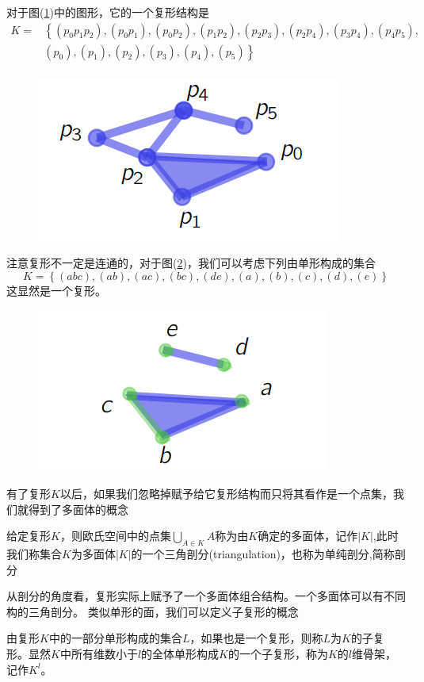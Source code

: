 \begin{example}
对于图(\ref{fig:333})中的图形，它的一个复形结构是
\begin{equation*}
    \begin{split}
      K=&\left\{\right.(p_{0}p_{1}p_{2}),(p_{0}p_{1}),(p_{0}p_{2}),(p_{1}p_{2}),(p_{2}p_{3}),(p_{2}p_{4}),(p_{3}p_{4}),(p_{4}p_{5}),\\
      &(p_{0}),(p_{1}),(p_{2}),(p_{3}),(p_{4}),(p_{5})\left.\right\}\\
    \end{split}
\end{equation*}

\end{example}
\begin{figure}[htbp]
    \centering
    \includegraphics{image/3.png}
    \caption{}
    \label{fig:333}
\end{figure}
注意复形不一定是连通的，对于图(\ref{fig:222})，我们可以考虑下列由单形构成的集合$$K=\left\{(abc),(ab),(ac),(bc),(de),(a),(b),(c),(d),(e)\right\}$$这显然是一个复形。
\begin{figure}[htbp]
    \centering
    \includegraphics{image/2.png}
    \caption{}
    \label{fig:222}
\end{figure}

有了复形$K$以后，如果我们忽略掉赋予给它复形结构而只将其看作是一个点集，我们就得到了多面体的概念
\begin{definition}
给定复形$K$，则欧氏空间中的点集$\bigcup\limits_{A\in K}A$称为由$K$确定的多面体，记作$|K|$,此时我们称集合$K$为多面体$|K|$的一个三角剖分(triangulation)，也称为单纯剖分,简称剖分
\end{definition}
从剖分的角度看，复形实际上赋予了一个多面体组合结构。一个多面体可以有不同构的三角剖分。
类似单形的面，我们可以定义子复形的概念
\begin{definition}
由复形$K$中的一部分单形构成的集合$L$，如果也是一个复形，则称$L$为$K$的子复形。显然$K$中所有维数小于$l$的全体单形构成$K$的一个子复形，称为$K$的$l$维骨架，记作$K^{l}$。
\end{definition}

